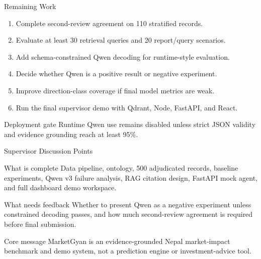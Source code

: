 \documentclass[aspectratio=169,11pt,hyperref={bookmarks=false}]{beamer}
\newcommand{\smallsep}{\vspace{0.35em}}
\begin{document}
\begin{frame}{Remaining Work}
  \begin{enumerate}
    \item Complete second-review agreement on 110 stratified records.
    \item Evaluate at least 30 retrieval queries and 20 report/query scenarios.
    \item Add schema-constrained Qwen decoding for runtime-style evaluation.
    \item Decide whether Qwen is a positive result or negative experiment.
    \item Improve direction-class coverage if final model metrics are weak.
    \item Run the final supervisor demo with Qdrant, Node, FastAPI, and React.
  \end{enumerate}
  \smallsep
  \begin{block}{Deployment gate}
    Runtime Qwen use remains disabled unless strict JSON validity and evidence grounding reach at least 95\%.
  \end{block}
\end{frame}

\begin{frame}{Supervisor Discussion Points}
  \begin{block}{What is complete}
    Data pipeline, ontology, 500 adjudicated records, baseline experiments, Qwen v3 failure analysis, RAG citation design, FastAPI mock agent, and full dashboard demo workspace.
  \end{block}
  \begin{block}{What needs feedback}
    Whether to present Qwen as a negative experiment unless constrained decoding passes, and how much second-review agreement is required before final submission.
  \end{block}
  \begin{block}{Core message}
    MarketGyan is an evidence-grounded Nepal market-impact benchmark and demo system, not a prediction engine or investment-advice tool.
  \end{block}
\end{frame}
\end{document}
